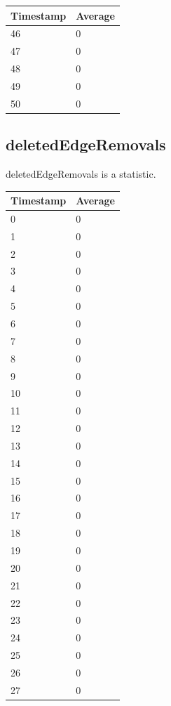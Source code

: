 \begin{tabular}{|l||l|}
\hline
	\textbf{Timestamp} & \textbf{Average} \\ \hline
	46 & 0 \\ \hline
	47 & 0 \\ \hline
	48 & 0 \\ \hline
	49 & 0 \\ \hline
	50 & 0 \\ \hline
\end{tabular}

\subsection{deletedEdgeRemovals}
deletedEdgeRemovals is a statistic.

%
%
\begin{tabular}{|l||l|}
\hline
	\textbf{Timestamp} & \textbf{Average} \\ \hline
	0 & 0 \\ \hline
	1 & 0 \\ \hline
	2 & 0 \\ \hline
	3 & 0 \\ \hline
	4 & 0 \\ \hline
	5 & 0 \\ \hline
	6 & 0 \\ \hline
	7 & 0 \\ \hline
	8 & 0 \\ \hline
	9 & 0 \\ \hline
	10 & 0 \\ \hline
	11 & 0 \\ \hline
	12 & 0 \\ \hline
	13 & 0 \\ \hline
	14 & 0 \\ \hline
	15 & 0 \\ \hline
	16 & 0 \\ \hline
	17 & 0 \\ \hline
	18 & 0 \\ \hline
	19 & 0 \\ \hline
	20 & 0 \\ \hline
	21 & 0 \\ \hline
	22 & 0 \\ \hline
	23 & 0 \\ \hline
	24 & 0 \\ \hline
	25 & 0 \\ \hline
	26 & 0 \\ \hline
	27 & 0 \\ \hline

\end{tabular}
